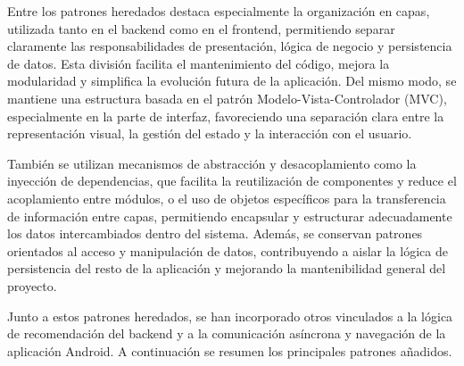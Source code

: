 Entre los patrones heredados destaca especialmente la organización en capas, utilizada tanto en el backend como en el frontend, permitiendo separar claramente las responsabilidades de presentación, lógica de negocio y persistencia de datos. Esta división facilita el mantenimiento del código, mejora la modularidad y simplifica la evolución futura de la aplicación. Del mismo modo, se mantiene una estructura basada en el patrón Modelo-Vista-Controlador (MVC), especialmente en la parte de interfaz, favoreciendo una separación clara entre la representación visual, la gestión del estado y la interacción con el usuario.

También se utilizan mecanismos de abstracción y desacoplamiento como la inyección de dependencias, que facilita la reutilización de componentes y reduce el acoplamiento entre módulos, o el uso de objetos específicos para la transferencia de información entre capas, permitiendo encapsular y estructurar adecuadamente los datos intercambiados dentro del sistema. Además, se conservan patrones orientados al acceso y manipulación de datos, contribuyendo a aislar la lógica de persistencia del resto de la aplicación y mejorando la mantenibilidad general del proyecto.

Junto a estos patrones heredados, se han incorporado otros vinculados a la lógica de recomendación del backend y a la comunicación asíncrona y navegación de la aplicación Android. A continuación se resumen los principales patrones añadidos.

